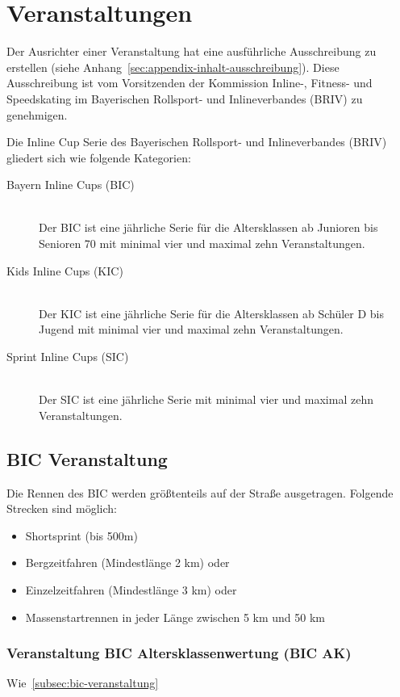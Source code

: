 \section{Veranstaltungen}
Der Ausrichter einer Veranstaltung hat eine ausführliche Ausschreibung zu erstellen (siehe Anhang~\ref{sec:appendix-inhalt-ausschreibung}). Diese Ausschreibung ist vom Vorsitzenden der Kommission Inline-, Fitness- und Speedskating im Bayerischen Rollsport- und Inlineverbandes (BRIV) zu genehmigen.

Die Inline Cup Serie des Bayerischen Rollsport- und Inlineverbandes (BRIV) gliedert sich wie folgende Kategorien:

\begin{description}
	\item[Bayern Inline Cups (BIC)] \hfill \\
	Der BIC ist eine jährliche Serie für die Altersklassen ab Junioren bis Senioren 70 mit minimal vier und maximal zehn Veranstaltungen.
	\item[Kids Inline Cups (KIC)] \hfill \\
	Der KIC ist eine jährliche Serie für die Altersklassen ab Schüler D bis Jugend mit minimal vier und maximal zehn Veranstaltungen.
	\item[Sprint Inline Cups (SIC)] \hfill \\
	Der SIC ist eine jährliche Serie mit minimal vier und maximal zehn Veranstaltungen.
\end{description}

\subsection{BIC Veranstaltung}
Die Rennen des BIC werden größtenteils auf der Straße ausgetragen. Folgende Strecken sind möglich:
\label{subsec:bic-veranstaltung}
\begin{itemize}
	\item Shortsprint (bis 500m)
	\item Bergzeitfahren (Mindestlänge 2 km) oder
	\item Einzelzeitfahren (Mindestlänge 3 km) oder
	\item Massenstartrennen in jeder Länge zwischen 5 km und 50 km
\end{itemize}

\subsubsection{Veranstaltung BIC Altersklassenwertung (BIC AK)}
Wie~\ref{subsec:bic-veranstaltung}


